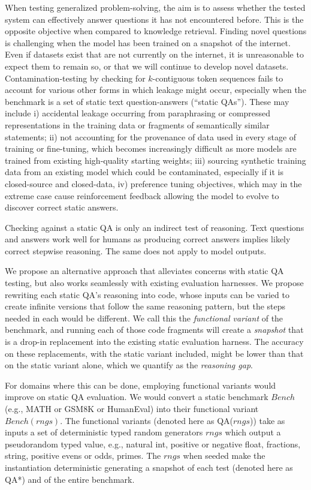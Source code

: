 \documentclass[11pt,a4paper]{article}
\begin{document}
When testing generalized problem-solving, the aim is to assess whether the
tested system can effectively answer questions it has not encountered before.
This is the opposite objective when compared to knowledge retrieval. 
Finding novel questions is challenging when the model has been trained on a
snapshot of the internet. Even if datasets exist that are not currently on the
internet, it is unreasonable to expect them to remain so, or that we will
continue to develop novel datasets. Contamination-testing by checking for
$k$-contiguous token sequences fails to account for various other forms in which
leakage might occur, especially when the benchmark is a set of static text
question-answers (``static QAs''). These may include i) accidental leakage
occurring from paraphrasing or compressed representations in the training data
or fragments of semantically similar statements; ii) not accounting for the
provenance of data used in every stage of training or fine-tuning, which
becomes increasingly difficult as more models are trained from existing
high-quality starting weights; iii) sourcing synthetic training data from an
existing model which could be contaminated, especially if it is closed-source
and closed-data, iv) preference tuning objectives, which may in the extreme
case cause reinforcement feedback allowing the model to evolve to discover
correct static answers.

Checking against a static QA is only an indirect test of reasoning. Text
questions and answers work well for humans as producing correct answers
implies likely correct stepwise reasoning.  The same does not apply to model
outputs.

We propose an alternative approach that alleviates concerns with static QA
testing, but also works seamlessly with existing evaluation harnesses. We
propose rewriting each static QA's reasoning into code, whose inputs can be
varied to create infinite versions that follow the same reasoning pattern, but
the steps needed in each would be different. We call this the {\em functional
variant} of the benchmark, and running each of those code fragments will create
a {\em snapshot} that is a drop-in replacement into the existing static
evaluation harness.  The accuracy on these replacements, with the static
variant included, might be lower than that on the static variant alone, which
we quantify as the {\em reasoning gap}.

For domains where this can be done, employing functional variants would improve
on static QA evaluation. We would convert a static benchmark $Bench$
(e.g., MATH or GSM8K or HumanEval) into their functional variant
$Bench(rngs)$. The functional variants (denoted here as QA($rngs$)) take as
inputs a set of deterministic typed random generators $rngs$ which output a
pseudorandom typed value, e.g., natural int, positive or negative float,
fractions, string, positive evens or odds, primes. The $rngs$ when seeded make
the instantiation deterministic generating  a snapshot of each test
(denoted here as QA*) and of the entire benchmark.
\end{document}
